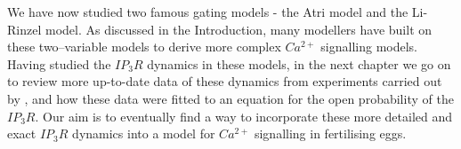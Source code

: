 We have now studied two famous gating models - the Atri model and the Li-Rinzel model. As discussed in the Introduction, many modellers have built on these two--variable models to derive more complex $Ca^{2+}$ signalling models. Having studied the $IP_3R$ dynamics in these models, in the next chapter we go on to review more up-to-date data of these dynamics from experiments carried out by , and how these data were fitted to an equation for the open probability of the $IP_3R$. Our aim is to eventually find a way to incorporate these more detailed and exact $IP_3R$ dynamics into a model for $Ca^{2+}$ signalling in fertilising eggs. 
